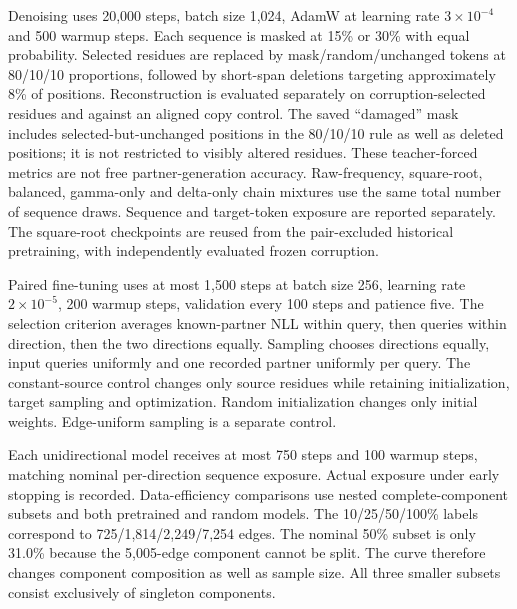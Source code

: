 \documentclass[10pt]{article}
\begin{document}
Denoising uses 20,000 steps, batch size 1,024, AdamW at learning rate
$3\times10^{-4}$ and 500 warmup steps. Each sequence is masked at 15\% or 30\%
with equal probability. Selected residues are replaced by mask/random/unchanged
tokens at 80/10/10 proportions, followed by short-span deletions targeting
approximately 8\% of positions. Reconstruction is evaluated separately on
corruption-selected residues and against an aligned copy control. The saved
``damaged'' mask includes selected-but-unchanged positions in the 80/10/10 rule
as well as deleted positions; it is not restricted to visibly altered residues.
These teacher-forced
metrics are not free partner-generation accuracy. Raw-frequency, square-root,
balanced, gamma-only and delta-only chain mixtures use the same total number of
sequence draws. Sequence and target-token exposure are reported separately.
The square-root checkpoints are reused from the pair-excluded historical
pretraining, with independently evaluated frozen corruption.

Paired fine-tuning uses at most 1,500 steps at batch size 256, learning rate
$2\times10^{-5}$, 200 warmup steps, validation every 100 steps and patience five.
The selection criterion averages known-partner NLL within query, then queries
within direction, then the two directions equally. Sampling chooses directions
equally, input queries uniformly and one recorded partner uniformly per query.
The constant-source control changes only source residues while retaining
initialization, target sampling and optimization. Random initialization changes
only initial weights. Edge-uniform sampling is a separate control.

Each unidirectional model receives at most 750 steps and 100 warmup steps,
matching nominal per-direction sequence exposure. Actual exposure under early
stopping is recorded. Data-efficiency comparisons use nested complete-component
subsets and both pretrained and random models. The 10/25/50/100\% labels
correspond to 725/1,814/2,249/7,254 edges. The nominal 50\% subset is only 31.0\%
because the 5,005-edge component cannot be split. The curve therefore changes
component composition as well as sample size.
All three smaller subsets consist exclusively of singleton components.
\end{document}
